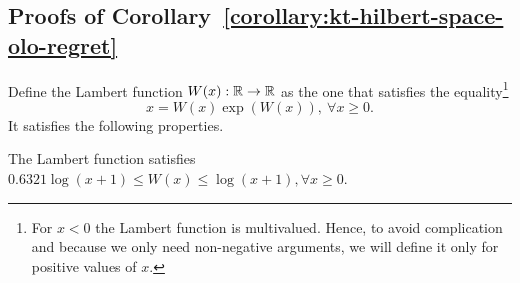 \subsection{Proofs of Corollary~\ref{corollary:kt-hilbert-space-olo-regret}}
Define the Lambert function $W(x):\mathbb{R}\rightarrow\mathbb{R}$ as the one that satisfies
the equality\footnote{For $x<0$ the Lambert function is multivalued. Hence, to
avoid complication and because we only need non-negative arguments, we will
define it only for positive values of $x$.}
\begin{equation}
\label{eq:lambert}
x=W(x) \exp \left(W(x)\right), \ \forall x\geq0.
\end{equation}
It satisfies the following properties.
%
\begin{lemma}
\label{lemma:lambert}
The Lambert function satisfies $0.6321 \log(x+1) \leq W(x) \leq \log(x+1), \forall x\geq0$.
\end{lemma}
%
